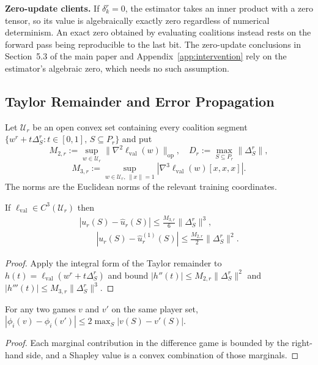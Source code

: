 \documentclass[letterpaper]{article} %
\providecommand{\lval}{\ell_{\mathrm{val}}}
\theoremstyle{definition}
\begin{document}
\noindent\textbf{Zero-update clients.} If $\delta_k^r = 0$, the estimator takes an
inner product with a zero tensor, so its value is algebraically exactly zero
regardless of numerical determinism. An exact zero obtained by evaluating
coalitions instead rests on the forward pass being reproducible to the last bit.
The zero-update conclusions in Section~5.3 of the main paper and
Appendix~\ref{app:intervention} rely on the estimator's algebraic zero, which
needs no such assumption.

\subsection{Taylor Remainder and Error Propagation}
\label{app:remainder}

Let $\mathcal U_r$ be an open convex set containing every coalition segment
$\{w^r + t\Delta_S^r : t \in [0,1],\, S \subseteq P_r\}$ and put
\[
M_{2,r} := \sup_{w \in \mathcal U_r}\|\nabla^2\lval(w)\|_{\mathrm{op}}, \quad
D_r := \max_{S \subseteq P_r}\|\Delta_S^r\|,
\]
\[
M_{3,r} := \sup_{w \in \mathcal U_r,\, \|x\| = 1}
|\nabla^3\lval(w)[x,x,x]|.
\]
The norms are the Euclidean norms of the relevant training coordinates.

\begin{proposition}
\label{prop:remainder}
If $\lval \in C^3(\mathcal U_r)$ then
\[
\begin{aligned}
|u_r(S) - \hat u_r(S)| \le \tfrac{M_{3,r}}{6}\|\Delta_S^r\|^3,
\\
\qquad |u_r(S) - \hat u_r^{(1)}(S)| \le \tfrac{M_{2,r}}{2}\|\Delta_S^r\|^2.
\end{aligned}
\]
\end{proposition}

\begin{proof}
Apply the integral form of the Taylor remainder to
$h(t) = \lval(w^r + t\Delta_S^r)$ and bound
$|h''(t)| \le M_{2,r}\|\Delta_S^r\|^2$ and
$|h'''(t)| \le M_{3,r}\|\Delta_S^r\|^3$.
\end{proof}

\begin{lemma}
\label{lem:prop}
For any two games $v$ and $v'$ on the same player set,
$|\phi_i(v) - \phi_i(v')| \le 2\max_S |v(S) - v'(S)|$.
\end{lemma}

\begin{proof}
Each marginal contribution in the difference game is bounded by the
right-hand side, and a Shapley value is a convex combination of those
marginals.
\end{proof}
\end{document}
